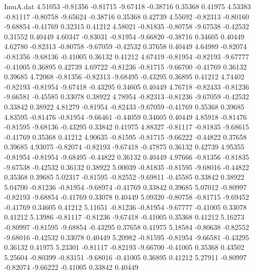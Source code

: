 \begin{filecontents}{ImuA.dat}
   4.51053   -0.81356   -0.81715   -9.67418   -0.38716    0.35368    0.41975
   4.53383   -0.81117   -0.80758   -9.65624   -0.38716    0.35368    0.42739
   4.55692   -0.82313   -0.80160   -9.68854   -0.41769    0.32315    0.41212
   4.58021   -0.81835   -0.80758   -9.67538   -0.42532    0.31552    0.40449
   4.60347   -0.83031   -0.81954   -9.66820   -0.38716    0.34605    0.40449
   4.62780   -0.82313   -0.80758   -9.67059   -0.42532    0.37658    0.40449
   4.64989   -0.82074   -0.81356   -9.68136   -0.41005    0.36132    0.41212
   4.67419   -0.81954   -0.82193   -9.67777   -0.41005    0.36895    0.42739
   4.69722   -0.81236   -0.81715   -9.66700   -0.41769    0.36132    0.39685
   4.72068   -0.81356   -0.82313   -9.68495   -0.43295    0.36895    0.41212
   4.74402   -0.82193   -0.81954   -9.67418   -0.43295    0.34605    0.40449
   4.76718   -0.82433   -0.81236   -9.66581   -0.45585    0.33078    0.38922
   4.78954   -0.82313   -0.81236   -9.67059   -0.42532    0.33842    0.38922
   4.81279   -0.81954   -0.82433   -9.67059   -0.41769    0.35368    0.39685
   4.83595   -0.81476   -0.81954   -9.66461   -0.44059    0.34605    0.40449
   4.85918   -0.81476   -0.81595   -9.68136   -0.43295    0.33842    0.41975
   4.88327   -0.81117   -0.81835   -9.68615   -0.41769    0.35368    0.41212
   4.90635   -0.81595   -0.81715   -9.66222   -0.44822    0.37658    0.39685
   4.93075   -0.82074   -0.82193   -9.67418   -0.47875    0.36132    0.42739
   4.95355   -0.81954   -0.81954   -9.68495   -0.44822    0.36132    0.40449
   4.97666   -0.81356   -0.81835   -9.67538   -0.42532    0.36132    0.38922
   5.00039   -0.81835   -0.81595   -9.68016   -0.44822    0.35368    0.39685
   5.02317   -0.81595   -0.82552   -9.69811   -0.45585    0.33842    0.38922
   5.04700   -0.81236   -0.81954   -9.68974   -0.41769    0.33842    0.39685
   5.07012   -0.80997   -0.82193   -9.68854   -0.41769    0.33078    0.40449
   5.09320   -0.80758   -0.81715   -9.69452   -0.41769    0.34605    0.41212
   5.11651   -0.81236   -0.81954   -9.67777   -0.41005    0.33078    0.41212
   5.13986   -0.81117   -0.81236   -9.67418   -0.41005    0.35368    0.41212
   5.16273   -0.80997   -0.81595   -9.68854   -0.43295    0.37658    0.41975
   5.18584   -0.80638   -0.82552   -9.68016   -0.42532    0.33078    0.40449
   5.20982   -0.81595   -0.81954   -9.66581   -0.43295    0.36132    0.41975
   5.23301   -0.81117   -0.82193   -9.66700   -0.41005    0.35368    0.43502
   5.25604   -0.80399   -0.83151   -9.68016   -0.41005    0.36895    0.41212
   5.27911   -0.80997   -0.82074   -9.66222   -0.41005    0.33842    0.40449

\end{filecontents}
